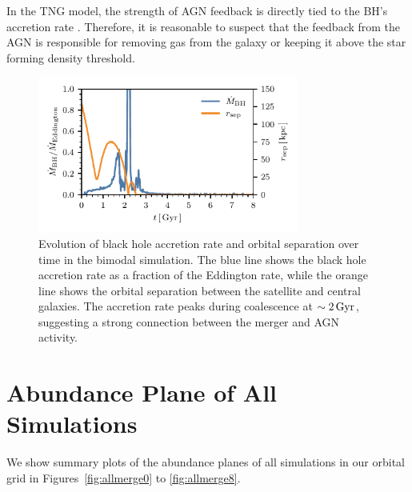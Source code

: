 \begin{appendices}
In the TNG model, the strength of AGN feedback is directly tied to the BH's accretion rate \citep{2017MNRAS.465.3291W}. Therefore, it is reasonable to suspect that the feedback from the AGN is responsible for removing gas from the galaxy or keeping it above the star forming density threshold.

\begin{figure}
  \centering
  \includegraphics[width=242.26653pt]{ch3/MdotBH_rsep.pdf}
  \caption{Evolution of black hole accretion rate and orbital separation over time in the bimodal simulation. The blue line shows the black hole accretion rate as a fraction of the Eddington rate, while the orange line shows the orbital separation between the satellite and central galaxies. The accretion rate peaks during coalescence at $\sim2\,\textrm{Gyr}$, suggesting a strong connection between the merger and AGN activity.}
  \label{fig:MdotBH_rsep}
\end{figure}

\section{Abundance Plane of All Simulations}\label{ch3:app:allmerge}
We show summary plots of the abundance planes of all simulations in our orbital grid in Figures~\ref{fig:allmerge0} to \ref{fig:allmerge8}.


\end{appendices}

